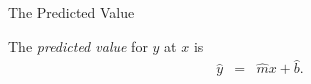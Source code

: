 \begin{frame}{The Predicted Value}

  \begin{definition}
    The \textit{predicted value} for $y$ at $x$ is
    \begin{eqnarray*}
      \hat{y} & = & \hat{m} x + \hat{b}.
    \end{eqnarray*}
  \end{definition}




  
\end{frame}

